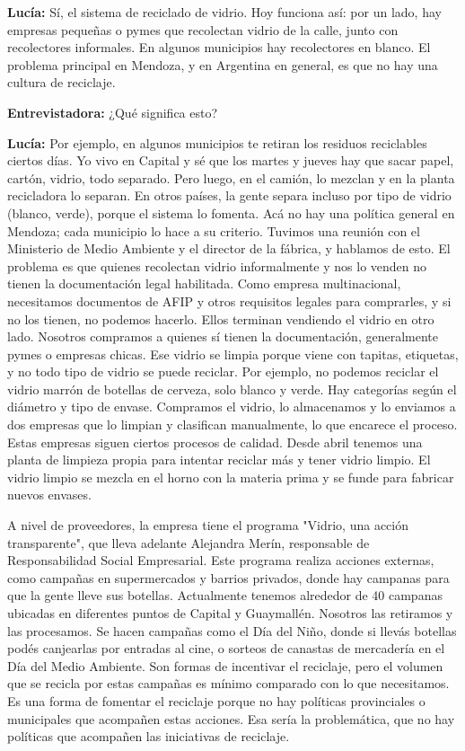 \textbf{Lucía:} Sí, el sistema de reciclado de vidrio. Hoy funciona así: por un lado, hay empresas pequeñas o pymes que recolectan vidrio de la calle, junto con recolectores informales. En algunos municipios hay recolectores en blanco. El problema principal en Mendoza, y en Argentina en general, es que no hay una cultura de reciclaje. 

\textbf{Entrevistadora:} ¿Qué significa esto?

\textbf{Lucía:} Por ejemplo, en algunos municipios te retiran los residuos reciclables ciertos días. Yo vivo en Capital y sé que los martes y jueves hay que sacar papel, cartón, vidrio, todo separado. Pero luego, en el camión, lo mezclan y en la planta recicladora lo separan. En otros países, la gente separa incluso por tipo de vidrio (blanco, verde), porque el sistema lo fomenta. Acá no hay una política general en Mendoza; cada municipio lo hace a su criterio. Tuvimos una reunión con el Ministerio de Medio Ambiente y el director de la fábrica, y hablamos de esto. El problema es que quienes recolectan vidrio informalmente y nos lo venden no tienen la documentación legal habilitada. Como empresa multinacional, necesitamos documentos de AFIP y otros requisitos legales para comprarles, y si no los tienen, no podemos hacerlo. Ellos terminan vendiendo el vidrio en otro lado. Nosotros compramos a quienes sí tienen la documentación, generalmente pymes o empresas chicas. Ese vidrio se limpia porque viene con tapitas, etiquetas, y no todo tipo de vidrio se puede reciclar. Por ejemplo, no podemos reciclar el vidrio marrón de botellas de cerveza, solo blanco y verde. Hay categorías según el diámetro y tipo de envase. Compramos el vidrio, lo almacenamos y lo enviamos a dos empresas que lo limpian y clasifican manualmente, lo que encarece el proceso. Estas empresas siguen ciertos procesos de calidad. Desde abril tenemos una planta de limpieza propia para intentar reciclar más y tener vidrio limpio. El vidrio limpio se mezcla en el horno con la materia prima y se funde para fabricar nuevos envases. 

A nivel de proveedores, la empresa tiene el programa "Vidrio, una acción transparente", que lleva adelante Alejandra Merín, responsable de Responsabilidad Social Empresarial. Este programa realiza acciones externas, como campañas en supermercados y barrios privados, donde hay campanas para que la gente lleve sus botellas. Actualmente tenemos alrededor de 40 campanas ubicadas en diferentes puntos de Capital y Guaymallén. Nosotros las retiramos y las procesamos. Se hacen campañas como el Día del Niño, donde si llevás botellas podés canjearlas por entradas al cine, o sorteos de canastas de mercadería en el Día del Medio Ambiente. Son formas de incentivar el reciclaje, pero el volumen que se recicla por estas campañas es mínimo comparado con lo que necesitamos. Es una forma de fomentar el reciclaje porque no hay políticas provinciales o municipales que acompañen estas acciones. Esa sería la problemática, que no hay políticas que acompañen las iniciativas de reciclaje.

